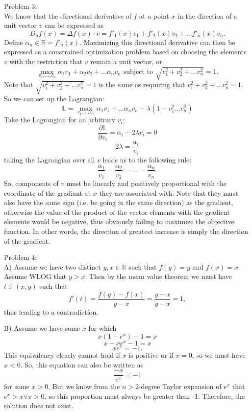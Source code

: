 \documentclass[12pt,leqno]{article}
\begin{document}
\bigskip
\noindent Problem 3:\\
\indent We know that the directional derivative of $f$ at a point $x$ in the direction of a unit vector $v$ can be expressed as
$$D_u f(x) = \Delta f(x) \cdot v = f'_1(x)v_1 + f'_2(x)v_2 + . . . f'_n(x) v_n.$$
Define $\alpha_n \in \mathds{R} = f'_n(x)$. Maximizing this directional derivative can then be expressed as a constrained optimization problem based on choosing the elements $v$ with the restriction that $v$ remain a unit vector, or
$$\max_{v_1,...,v_n} \alpha_1v_1 + \alpha_2v_2 + . . . \alpha_n v_n \text{ subject to } \sqrt{v^2_1 + v^2_2 +  . . . v^2_n} = 1.$$
Note that $\sqrt{v^2_1 + v^2_2 +  . . . v^2_n} = 1$ is the same as requiring that $v^2_1 + v^2_2 +  . . . v^2_n = 1.$ So we can set up the Lagrangian:
$$\mathds{L} = \max_{v_1,...,v_n} \alpha_1v_1 + . . . \alpha_nv_n - \lambda(1 - v^2_1 . . . v^2_n)$$
Take the Lagrangian for an arbitrary $v_i$:
$$\frac{\partial \mathds{L}}{\partial v_i} =\alpha_i -2\lambda v_i = 0$$
$$2\lambda = \frac{\alpha_i}{v_i}$$
taking the Lagrangian over all $v$ leads us to the following rule:
$$\frac{\alpha_1}{v_1} = \frac{\alpha_2}{v_2} = ... = \frac{\alpha_n}{v_n}.$$
So, components of $v$ must be linearly and positively proportional with the coordinate of the gradiant at $x$ they are associated with. Note that they must also have the same sign (i.e. be going in the same direction) as the gradient, otherwise the value of the product of the vector elements with the gradient elements would be negative, thus obviously failing to maximize the objective function. In other words, the direction of greatest increase is simply the direction of the gradient.


\bigskip
\noindent Problem 4:\\
\indent A) Assume we have two distinct $y, x \in \mathds{R}$ such that $f(y) = y$ and $f(x) = x$. Assume WLOG that $y>x$. Then by the mean value theorem we must have $t \in (x, y)$ such that
$$f'(t) = \frac{f(y) - f(x)}{y-x} = \frac{y-x}{y-x} = 1,$$
thus leading to a contradiction. 

\indent B) Assume we have some $x$ for which
$$x(1-e^x) - 1 = x$$
$$x - xe^x - 1 = x$$
$$xe^x = -1.$$
This equivalency clearly cannot hold if $x$ is positive or if $x=0$, so we must have $x<0$. So, this equation can also be written as
$$\frac{-x}{e^x} = -1$$
for some $x>0$. But we know from the $n>2$-degree  Taylor expansion of $e^x$ that $e^x > x \forall x>0$, so this proportion must always be greater than -1. Therefore, the solution does not exist.
\end{document}
